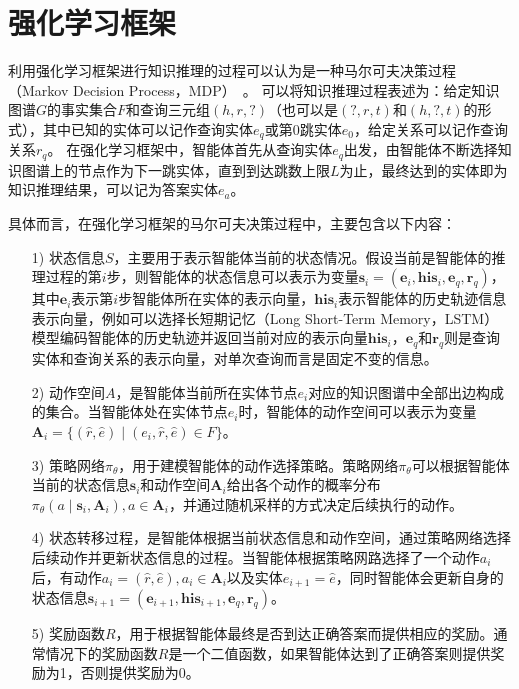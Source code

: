 \documentclass[algorithmlist, AutoFakeBold, AutoFakeSlant, figurelist, tablelist, nomlist, engineering, openany]{seuthesix} %
\begin{document}


\section{强化学习框架}
利用强化学习框架进行知识推理的过程可以认为是一种马尔可夫决策过程（Markov Decision Process，MDP）~\cite{gronauer2022multi}。
可以将知识推理过程表述为：给定知识图谱$G$的事实集合$F$和查询三元组$(h, r, ?)$（也可以是$(?, r, t)$和$(h, ?, t)$的形式），其中已知的实体可以记作查询实体$e_q$或第0跳实体$e_0$，给定关系可以记作查询关系$r_q$。
在强化学习框架中，智能体首先从查询实体$e_q$出发，由智能体不断选择知识图谱上的节点作为下一跳实体，直到到达跳数上限$L$为止，最终达到的实体即为知识推理结果，可以记为答案实体$e_a$。

具体而言，在强化学习框架的马尔可夫决策过程中，主要包含以下内容：
\begin{itemize}
  \item [1)] 状态信息$S$，主要用于表示智能体当前的状态情况。假设当前是智能体的推理过程的第$i$步，则智能体的状态信息可以表示为变量$\bm{s}_i = (\bm{e}_i, \bm{his}_i, \bm{e}_q, \bm{r}_q)$，其中$\bm{e}_i$表示第$i$步智能体所在实体的表示向量，$\bm{his}_i$表示智能体的历史轨迹信息表示向量，例如可以选择长短期记忆（Long Short-Term Memory，LSTM）模型编码智能体的历史轨迹并返回当前对应的表示向量$\bm{his}_i$，$\bm{e}_q$和$\bm{r}_q$则是查询实体和查询关系的表示向量，对单次查询而言是固定不变的信息。
  \item [2)] 动作空间$A$，是智能体当前所在实体节点$e_i$对应的知识图谱中全部出边构成的集合。当智能体处在实体节点$e_i$时，智能体的动作空间可以表示为变量$\bm{A}_i = \{(\hat{r}, \hat{e}) \mid (e_i, \hat{r}, \hat{e}) \in F\}$。
  \item [3)] 策略网络$\pi_\theta$，用于建模智能体的动作选择策略。策略网络$\pi_\theta$可以根据智能体当前的状态信息$\bm{s}_i$和动作空间$\bm{A}_i$给出各个动作的概率分布$\pi_\theta(a \mid \bm{s}_i, \bm{A}_i), a \in \bm{A}_i$，并通过随机采样的方式决定后续执行的动作。
  \item [4)] 状态转移过程，是智能体根据当前状态信息和动作空间，通过策略网络选择后续动作并更新状态信息的过程。当智能体根据策略网路选择了一个动作$a_i$后，有动作$a_i = (\hat{r}, \hat{e}), a_i \in \bm{A}_i$以及实体$e_{i+1}=\hat{e}$，同时智能体会更新自身的状态信息$\bm{s}_{i+1} = (\bm{e}_{i+1}, \bm{his}_{i+1}, \bm{e}_q, \bm{r}_q)$。
  \item [5)] 奖励函数$R$，用于根据智能体最终是否到达正确答案而提供相应的奖励。通常情况下的奖励函数$R$是一个二值函数，如果智能体达到了正确答案则提供奖励为1，否则提供奖励为0。
\end{itemize}
\end{document}
